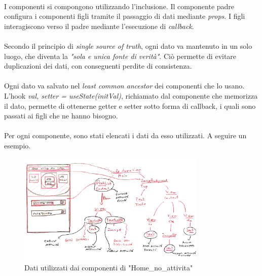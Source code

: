 \documentclass[11pt,a4paper,english]{article}
\begin{document}
\paragraph{} I componenti si compongono utilizzando l'inclusione. Il componente padre configura i componenti figli tramite il passaggio di dati mediante \emph{props}. I figli interagiscono verso il padre mediante l'esecuzione di \emph{callback}.

\paragraph{} Secondo il principio di \emph{single source of truth}, ogni dato va mantenuto in un solo luogo, che diventa la \emph{"sola e unica fonte di verità"}. Ciò permette di evitare duplicazioni dei dati, con conseguenti perdite di consistenza. 

\paragraph{} Ogni dato va salvato nel \emph{least common ancestor} dei componenti che lo usano. L'hook \emph{val, setter = useState(initVal)}, richiamato dal componente che memorizza il dato, permette di ottenerne getter e setter sotto forma di callback, i quali sono passati ai figli che ne hanno bisogno.

\paragraph{} Per ogni componente, sono stati elencati i dati da esso utilizzati. A seguire un esempio. 

\begin{figure}[H]
    \centering
    \includegraphics[width=0.8\textwidth]{img/componenti home dati.pdf}
    \caption{Dati utilizzati dai componenti di "Home\_no\_attivita"}
\end{figure}
\end{document}
